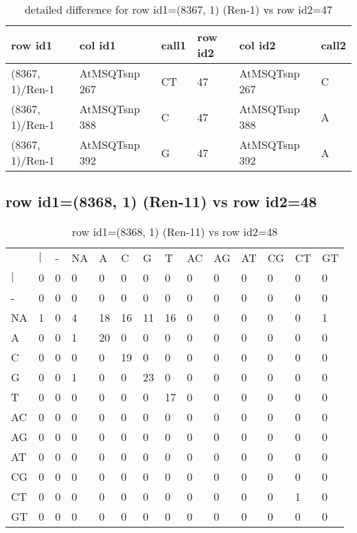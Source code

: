 \begin{center}
\begin{longtable}{|l|l|l|l|l|l|}
\caption{detailed difference for row id1=(8367, 1) (Ren-1) vs row id2=47} \label{table_dm397}\\
\hline
row id1&col id1&call1&row id2&col id2&call2\\
\hline
(8367, 1)/Ren-1&AtMSQTsnp 267&CT&47&AtMSQTsnp 267&C\\
(8367, 1)/Ren-1&AtMSQTsnp 388&C&47&AtMSQTsnp 388&A\\
(8367, 1)/Ren-1&AtMSQTsnp 392&G&47&AtMSQTsnp 392&A\\
\hline
\end{longtable}
\end{center}

\subsection{row id1=(8368, 1) (Ren-11) vs row id2=48}
\begin{center}
\begin{longtable}{|l|l|l|l|l|l|l|l|l|l|l|l|l|l|}
\caption{row id1=(8368, 1) (Ren-11) vs row id2=48} \label{table_dm398}\\
\hline
\\
\hline
&$|$&-&NA&A&C&G&T&AC&AG&AT&CG&CT&GT\\
$|$&0&0&0&0&0&0&0&0&0&0&0&0&0\\
-&0&0&0&0&0&0&0&0&0&0&0&0&0\\
NA&1&0&4&18&16&11&16&0&0&0&0&0&1\\
A&0&0&1&20&0&0&0&0&0&0&0&0&0\\
C&0&0&0&0&19&0&0&0&0&0&0&0&0\\
G&0&0&1&0&0&23&0&0&0&0&0&0&0\\
T&0&0&0&0&0&0&17&0&0&0&0&0&0\\
AC&0&0&0&0&0&0&0&0&0&0&0&0&0\\
AG&0&0&0&0&0&0&0&0&0&0&0&0&0\\
AT&0&0&0&0&0&0&0&0&0&0&0&0&0\\
CG&0&0&0&0&0&0&0&0&0&0&0&0&0\\
CT&0&0&0&0&0&0&0&0&0&0&0&1&0\\
GT&0&0&0&0&0&0&0&0&0&0&0&0&0\\
\hline
\end{longtable}
\end{center}

